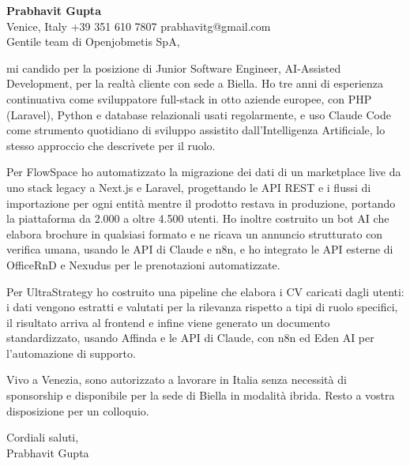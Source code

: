 \documentclass[a4paper,10.5pt]{article}
\begin{document}
\textbf{Prabhavit Gupta}\\
Venice, Italy \textbar{} +39 351 610 7807 \textbar{} prabhavitg@gmail.com\\[10pt]
Gentile team di Openjobmetis SpA,

mi candido per la posizione di Junior Software Engineer, AI-Assisted Development, per la realtà cliente con sede a Biella. Ho tre anni di esperienza continuativa come sviluppatore full-stack in otto aziende europee, con PHP (Laravel), Python e database relazionali usati regolarmente, e uso Claude Code come strumento quotidiano di sviluppo assistito dall'Intelligenza Artificiale, lo stesso approccio che descrivete per il ruolo.

Per FlowSpace ho automatizzato la migrazione dei dati di un marketplace live da uno stack legacy a Next.js e Laravel, progettando le API REST e i flussi di importazione per ogni entità mentre il prodotto restava in produzione, portando la piattaforma da 2.000 a oltre 4.500 utenti. Ho inoltre costruito un bot AI che elabora brochure in qualsiasi formato e ne ricava un annuncio strutturato con verifica umana, usando le API di Claude e n8n, e ho integrato le API esterne di OfficeRnD e Nexudus per le prenotazioni automatizzate.

Per UltraStrategy ho costruito una pipeline che elabora i CV caricati dagli utenti: i dati vengono estratti e valutati per la rilevanza rispetto a tipi di ruolo specifici, il risultato arriva al frontend e infine viene generato un documento standardizzato, usando Affinda e le API di Claude, con n8n ed Eden AI per l'automazione di supporto.

Vivo a Venezia, sono autorizzato a lavorare in Italia senza necessità di sponsorship e disponibile per la sede di Biella in modalità ibrida. Resto a vostra disposizione per un colloquio.

Cordiali saluti,\\
Prabhavit Gupta
\end{document}
